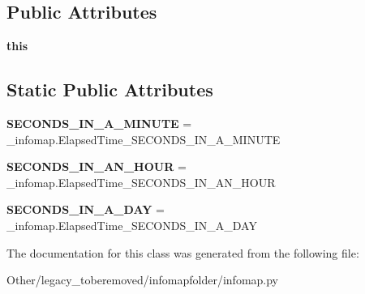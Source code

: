 \subsection*{Public Attributes}
\begin{DoxyCompactItemize}
\item 
\mbox{\label{classinfomapfolder_1_1infomap_1_1ElapsedTime_a5ae96e300404f2ff4aa709a77e3000c4}} 
{\bfseries this}
\end{DoxyCompactItemize}
\subsection*{Static Public Attributes}
\begin{DoxyCompactItemize}
\item 
\mbox{\label{classinfomapfolder_1_1infomap_1_1ElapsedTime_a4bf495c41fcd53706d0e8f1aafa0c0ff}} 
{\bfseries S\+E\+C\+O\+N\+D\+S\+\_\+\+I\+N\+\_\+\+A\+\_\+\+M\+I\+N\+U\+TE} = \+\_\+infomap.\+Elapsed\+Time\+\_\+\+S\+E\+C\+O\+N\+D\+S\+\_\+\+I\+N\+\_\+\+A\+\_\+\+M\+I\+N\+U\+TE
\item 
\mbox{\label{classinfomapfolder_1_1infomap_1_1ElapsedTime_a3ce64a9ce15773067132dd2ee72a013c}} 
{\bfseries S\+E\+C\+O\+N\+D\+S\+\_\+\+I\+N\+\_\+\+A\+N\+\_\+\+H\+O\+UR} = \+\_\+infomap.\+Elapsed\+Time\+\_\+\+S\+E\+C\+O\+N\+D\+S\+\_\+\+I\+N\+\_\+\+A\+N\+\_\+\+H\+O\+UR
\item 
\mbox{\label{classinfomapfolder_1_1infomap_1_1ElapsedTime_a000a9b3bc67cd3964b538005365db072}} 
{\bfseries S\+E\+C\+O\+N\+D\+S\+\_\+\+I\+N\+\_\+\+A\+\_\+\+D\+AY} = \+\_\+infomap.\+Elapsed\+Time\+\_\+\+S\+E\+C\+O\+N\+D\+S\+\_\+\+I\+N\+\_\+\+A\+\_\+\+D\+AY
\end{DoxyCompactItemize}


The documentation for this class was generated from the following file\+:\begin{DoxyCompactItemize}
\item 
Other/legacy\+\_\+toberemoved/infomapfolder/infomap.\+py\end{DoxyCompactItemize}
